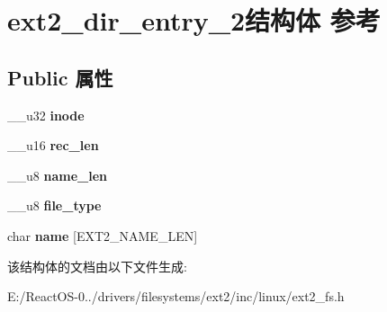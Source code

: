 \hypertarget{structext2__dir__entry__2}{}\section{ext2\+\_\+dir\+\_\+entry\+\_\+2结构体 参考}
\label{structext2__dir__entry__2}
\subsection*{Public 属性}
\begin{DoxyCompactItemize}
\item 
\mbox{\label{structext2__dir__entry__2_adc23022ba49bd39e266555f3fb33eb05}} 
\+\_\+\+\_\+u32 {\bfseries inode}
\item 
\mbox{\label{structext2__dir__entry__2_adebe9b468ff7845ebc09075c846fb412}} 
\+\_\+\+\_\+u16 {\bfseries rec\+\_\+len}
\item 
\mbox{\label{structext2__dir__entry__2_aae5c54aa5ba8a87305123256feb2f7c9}} 
\+\_\+\+\_\+u8 {\bfseries name\+\_\+len}
\item 
\mbox{\label{structext2__dir__entry__2_a5cfe48cf1d15acd87d0218dd677f0dcc}} 
\+\_\+\+\_\+u8 {\bfseries file\+\_\+type}
\item 
\mbox{\label{structext2__dir__entry__2_ac4d2ad30f843cb71035c6cb64025e20b}} 
char {\bfseries name} \mbox{[}E\+X\+T2\+\_\+\+N\+A\+M\+E\+\_\+\+L\+EN\mbox{]}
\end{DoxyCompactItemize}


该结构体的文档由以下文件生成\+:\begin{DoxyCompactItemize}
\item 
E\+:/\+React\+O\+S-\/0../drivers/filesystems/ext2/inc/linux/ext2\+\_\+fs.\+h\end{DoxyCompactItemize}
